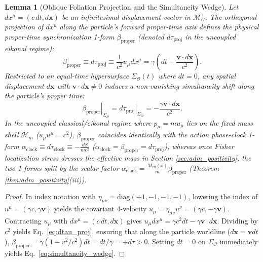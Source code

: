 \documentclass[11pt, a4paper]{article}
\newtheorem{lemma}[theorem]{Lemma}
\theoremstyle{definition}
\begin{document}
\begin{lemma}[Oblique Foliation Projection and the Simultaneity Wedge]
\label{lem:simultaneity}
Let $dx^\mu = (c\,dt, d\mathbf{x})$ be an infinitesimal displacement vector in $\mathcal{M}_{\mathcal{O}}$. The orthogonal projection of $dx^\mu$ along the particle's forward proper-time axis defines the physical proper-time synchronization 1-form $\beta_{\text{proper}}$ (denoted $d\tau_{\text{proj}}$ in the uncoupled eikonal regime):
\begin{equation}
\label{eq:dtau_proj}
\beta_{\text{proper}} \equiv d\tau_{\text{proj}} \equiv \frac{1}{c^2} u_\mu dx^\mu = \gamma \left( dt - \frac{\mathbf{v} \cdot d\mathbf{x}}{c^2} \right).
\end{equation}
Restricted to an equal-time hypersurface $\Sigma_{\mathcal{O}}(t)$ where $dt = 0$, any spatial displacement $d\mathbf{x}$ with $\mathbf{v}\cdot d\mathbf{x} \neq 0$ induces a non-vanishing simultaneity shift along the particle's proper time:
\begin{equation}
\label{eq:simultaneity_wedge}
\left. \beta_{\text{proper}} \right|_{\Sigma_{\mathcal{O}}} = \left. d\tau_{\text{proj}} \right|_{\Sigma_{\mathcal{O}}} = -\frac{\gamma \mathbf{v} \cdot d\mathbf{x}}{c^2}.
\end{equation}
In the uncoupled classical/eikonal regime where $p_\mu = m u_\mu$ lies on the fixed mass shell $\mathcal{H}_m$ ($u_\mu u^\mu = c^2$), $\beta_{\text{proper}}$ coincides identically with the action phase-clock 1-form $\alpha_{\text{clock}} \equiv d\tau_{\text{clock}} \equiv -\frac{dS}{mc^2}$ ($\alpha_{\text{clock}} = \beta_{\text{proper}} = d\tau_{\text{proj}}$), whereas once Fisher localization stress dresses the effective mass in Section \ref{sec:adm_positivity}, the two 1-forms split by the scalar factor $\alpha_{\text{clock}} = \frac{M_{\text{eff}}(x)}{m}\beta_{\text{proper}}$ (Theorem \ref{thm:adm_positivity}(iii)).
\end{lemma}

\begin{proof}
In index notation with $\eta_{\mu\nu} = \text{diag}(+1,-1,-1,-1)$, lowering the index of $u^\mu = (\gamma c, \gamma \mathbf{v})$ yields the covariant 4-velocity $u_\mu = \eta_{\mu\nu}u^\nu = (\gamma c, -\gamma \mathbf{v})$. Contracting $u_\mu$ with $dx^\mu = (c\,dt, d\mathbf{x})$ gives $u_\mu dx^\mu = \gamma c^2 dt - \gamma \mathbf{v}\cdot d\mathbf{x}$. Dividing by $c^2$ yields Eq.~\eqref{eq:dtau_proj}, ensuring that along the particle worldline ($d\mathbf{x} = \mathbf{v}dt$), $\beta_{\text{proper}} = \gamma(1 - v^2/c^2)dt = dt/\gamma = +d\tau > 0$. Setting $dt = 0$ on $\Sigma_{\mathcal{O}}$ immediately yields Eq.~\eqref{eq:simultaneity_wedge}.
\end{proof}
\end{document}
